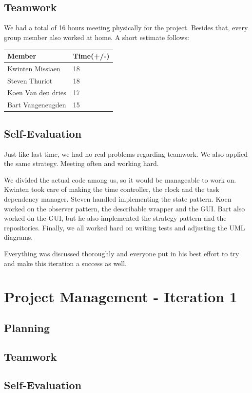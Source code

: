		\subsection{Teamwork}
		
		
		We had a total of 16 hours meeting physically for the project. Besides that, every group member also worked at home. A short estimate follows:\\
		 \begin{tabular}{l|l}
		Member & Time(+/-)\\ \hline
		Kwinten Missiaen & 18\\
		Steven Thuriot & 18\\
		Koen Van den dries & 17\\
		Bart Vangeneugden & 15\\
		\end{tabular}
		\subsection{Self-Evaluation}
		Just like last time, we had no real problems regarding teamwork. We also applied the same strategy. Meeting often and working hard.
	
		We divided the actual code among us, so it would be manageable to work on. Kwinten took care of making the time controller, the clock and the task dependency manager. Steven handled implementing the state pattern. Koen worked on the observer pattern, the describable wrapper and the GUI. Bart also worked on the GUI, but he also implemented the strategy pattern and the repositories. Finally, we all worked hard on writing tests and adjusting the UML diagrams.
	
		Everything was discussed thoroughly and everyone put in his best effort to try and make this iteration a success as well.
		
		\section{Project Management - Iteration 1}
			\subsection{Planning}
			\subsection{Teamwork}
			\subsection{Self-Evaluation}
		
